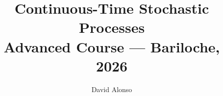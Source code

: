 \documentclass[11pt,a4paper]{article}
\title{Continuous-Time Stochastic Processes\\\large Advanced Course --- Bariloche, 2026}
\author{David Alonso}
\date{}
\begin{document}
\maketitle
\tableofcontents
% 
% 
% 

\pagebreak


% 





% 
% 




%











\end{document}
